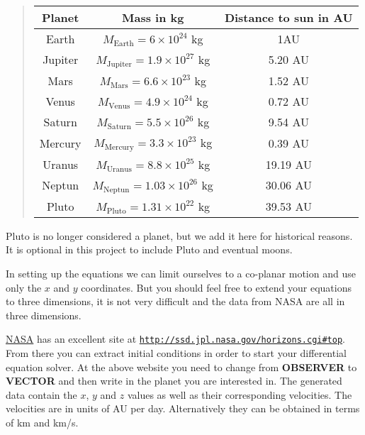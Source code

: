 \documentclass[%
oneside,                 %
final,                   %
10pt]{article}
\begin{document}
\begin{quote}
\begin{tabular}{ccc}
\hline
\multicolumn{1}{c}{ Planet } & \multicolumn{1}{c}{ Mass in kg } & \multicolumn{1}{c}{ Distance to  sun in AU } \\
\hline
Earth   & $M_{\mathrm{Earth}}=6\times 10^{24}$ kg     & 1AU                    \\
Jupiter & $M_{\mathrm{Jupiter}}=1.9\times 10^{27}$ kg & 5.20 AU                \\
Mars    & $M_{\mathrm{Mars}}=6.6\times 10^{23}$ kg    & 1.52 AU                \\
Venus   & $M_{\mathrm{Venus}}=4.9\times 10^{24}$ kg   & 0.72 AU                \\
Saturn  & $M_{\mathrm{Saturn}}=5.5\times 10^{26}$ kg  & 9.54 AU                \\
Mercury & $M_{\mathrm{Mercury}}=3.3\times 10^{23}$ kg & 0.39 AU                \\
Uranus  & $M_{\mathrm{Uranus}}=8.8\times 10^{25}$ kg  & 19.19 AU               \\
Neptun  & $M_{\mathrm{Neptun}}=1.03\times 10^{26}$ kg & 30.06 AU               \\
Pluto   & $M_{\mathrm{Pluto}}=1.31\times 10^{22}$ kg  & 39.53 AU               \\
\hline
\end{tabular}
\end{quote}

\noindent
Pluto is no longer considered  a planet, but we add it here for historical reasons. It is optional in this project to include Pluto and eventual moons. 

In setting up the equations we can limit ourselves to a co-planar motion and use only the $x$ and $y$ coordinates. But you should feel free to extend your equations to three dimensions, it is not very difficult and the data from NASA are all in three dimensions.

\href{{http://www.nasa.gov/index.html}}{NASA} has an excellent site at \href{{http://ssd.jpl.nasa.gov/horizons.cgi#top}}{\nolinkurl{http://ssd.jpl.nasa.gov/horizons.cgi\#top}}.
From there you can extract initial conditions in order to start your differential equation solver.
At the above website you need to change from \textbf{OBSERVER} to \textbf{VECTOR} and then write in the planet you are interested in.
The generated data contain the $x$, $y$ and $z$ values as well as their corresponding velocities. The velocities are in units of AU per day.
Alternatively they can be obtained in terms of km and km/s. 
\end{document}
